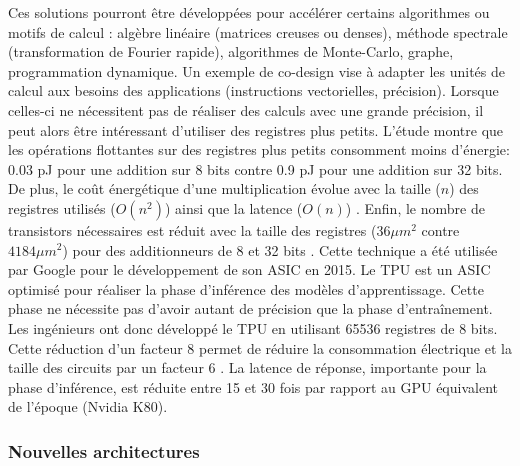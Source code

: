         Ces solutions pourront être développées pour accélérer certains algorithmes ou motifs de calcul \cite{asanovic2006landscape}: algèbre linéaire (matrices creuses ou denses), méthode spectrale (transformation de Fourier rapide), algorithmes de Monte-Carlo, graphe, programmation dynamique. Un exemple de co-design vise à adapter les unités de calcul aux besoins des applications (instructions vectorielles, précision). Lorsque celles-ci ne nécessitent pas de réaliser des calculs avec une grande précision, il peut alors être intéressant d’utiliser des registres plus petits. L’étude \cite{Horowitz2014} montre que les opérations flottantes sur des registres plus petits consomment moins d’énergie: 0.03 pJ pour une addition sur 8 bits contre 0.9 pJ pour une addition sur 32 bits. De plus, le coût énergétique d’une multiplication évolue avec la taille ($n$) des registres utilisés ($O(n^2)$) ainsi que la latence ($O(n)$) \cite{Sze2017}. Enfin, le nombre de transistors nécessaires est réduit avec la taille des registres ($36 \mu m^2$ contre $4184 \mu m^2$) pour des additionneurs de 8 et 32 bits \cite{Horowitz2014}. Cette technique a été utilisée par Google pour le développement de son ASIC en 2015. Le TPU est un ASIC optimisé pour réaliser la phase d'inférence des modèles d'apprentissage. Cette phase ne nécessite pas d'avoir autant de précision que la phase d'entraînement. Les ingénieurs ont donc développé le TPU en utilisant 65536 registres de 8 bits. Cette réduction d'un facteur 8 permet de réduire la consommation électrique et la taille des circuits par un facteur 6 \cite{Jouppi2017}. La latence de réponse, importante pour la phase d'inférence, est réduite entre 15 et 30 fois par rapport au GPU équivalent de l'époque (Nvidia K80).
            
          
            
    
        
    \subsubsection{Nouvelles architectures}\label{sec:new_soc}
    
